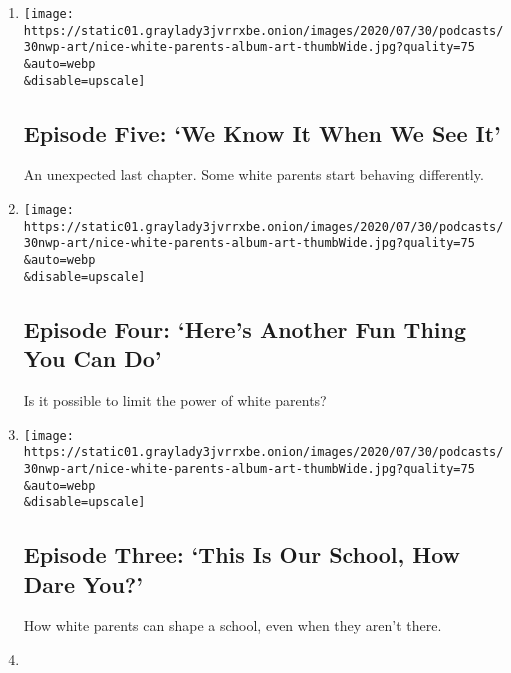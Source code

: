 \begin{enumerate}
\def\labelenumi{\arabic{enumi}.}
\item
  \href{/2020/08/20/podcasts/nice-white-parents-school.html}{}

  \texttt{[image: https://static01.graylady3jvrrxbe.onion/images/2020/07/30/podcasts/30nwp-art/nice-white-parents-album-art-thumbWide.jpg?quality=75\\\&auto=webp\\\&disable=upscale]}

  \hypertarget{episode-five-we-know-it-when-we-see-it}{%
  \subsection{Episode Five: `We Know It When We See
  It'}\label{episode-five-we-know-it-when-we-see-it}}

  An unexpected last chapter. Some white parents start behaving
  differently.
\item
  \href{/2020/08/13/podcasts/nice-white-parents-school.html}{}

  \texttt{[image: https://static01.graylady3jvrrxbe.onion/images/2020/07/30/podcasts/30nwp-art/nice-white-parents-album-art-thumbWide.jpg?quality=75\\\&auto=webp\\\&disable=upscale]}

  \hypertarget{episode-four-heres-another-fun-thing-you-can-do}{%
  \subsection{Episode Four: `Here's Another Fun Thing You Can
  Do'}\label{episode-four-heres-another-fun-thing-you-can-do}}

  Is it possible to limit the power of white parents?
\item
  \href{/2020/08/06/podcasts/episode-three-this-is-our-school-how-dare-you.html}{}

  \texttt{[image: https://static01.graylady3jvrrxbe.onion/images/2020/07/30/podcasts/30nwp-art/nice-white-parents-album-art-thumbWide.jpg?quality=75\\\&auto=webp\\\&disable=upscale]}

  \hypertarget{episode-three-this-is-our-school-how-dare-you}{%
  \subsection{Episode Three: `This Is Our School, How Dare
  You?'}\label{episode-three-this-is-our-school-how-dare-you}}

  How white parents can shape a school, even when they aren't there.
\item
  \href{/2020/07/30/podcasts/nice-white-parents-serial-2.html}{}


\end{enumerate}
